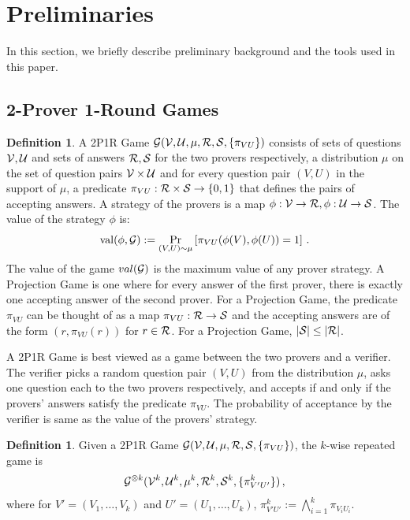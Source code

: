 \documentclass[10pt]{article}
\theoremstyle{definition}
\newtheorem{definition}[theorem]{Definition}
\numberwithin{equation}{section}
\newcommand\calU{{\cal U}}
\newcommand\calV{{\cal V}}
\DeclareMathOperator\val{val}
\renewcommand{\mapsto}{\to}
\begin{document}
\section{Preliminaries}
In this section, we briefly describe preliminary background and the tools used in this paper.

\subsection{2-Prover 1-Round Games}

\begin{definition} \label{def:2p1r} A 2P1R Game ${\cal G}(\calV, \calU, \mu, {\cal R}, {\cal S},
\{ \pi_{VU}\} )$ consists of sets of questions $\calV, \calU$ and
sets of answers ${\cal R}, {\cal S}$ for the two provers
respectively, a distribution $\mu$ on the set of question pairs
$\calV \times \calU$ and for every question pair $(V,U)$ in the
support of $\mu$, a predicate $\pi_{VU}: {\cal R} \times {\cal S}
\mapsto \{0,1\}$ that defines the pairs of accepting answers.
A strategy of the %
provers is a map $\phi: \calV
\mapsto {\cal R}, \phi: \calU \mapsto {\cal S}$. The value of the
strategy $\phi$ is:
\[
  \val(\phi, {\cal G}) := \Pr_{(V,U) \sim \mu} \left[ \pi_{VU} (
  \phi(V), \phi(U) ) =1
 \right]\,.
\]
The value of the game ${\rm val}({\cal G})$ is the maximum value of
any prover strategy. A Projection Game is one where for every answer
of the first prover, there is exactly one accepting answer of the
second prover. For a Projection Game, the predicate $\pi_{VU}$ can
be thought of as a map $\pi_{VU}: {\cal R} \mapsto {\cal S}$ and
the accepting answers are of the form $(r, \pi_{VU}(r))$ for $r \in {\cal R}$.
For a Projection Game, $|{\cal S}| \leq |{\cal R}|$.
\end{definition}

A 2P1R Game is
best viewed as a game between the two provers and a verifier. The verifier
picks a random question pair $(V,U)$
from the distribution $\mu$, asks one question each to the two provers respectively,
and accepts if and only if the provers' answers satisfy the predicate $\pi_{VU}$.
The probability of acceptance
%
by
the verifier is same as the value of 
%
the
provers' strategy.

\begin{definition} Given a 2P1R Game ${\cal G}(\calV, \calU, \mu, {\cal R}, {\cal S},
\{ \pi_{VU}\} )$, the $k$-wise repeated game is
 \[
{\cal G}^{\otimes k}(\calV^k, \calU^k, \mu^k, {\cal R}^k, {\cal S}^k,
\{ \pi^k_{V'U'}\} )\,,
\] where for $V' = (V_1, \ldots, V_k)$ and $U' =
(U_1,\ldots, U_k)$, $\pi^k_{V'U'} := \bigwedge_{i=1}^k \pi_{V_iU_i}$.
\end{definition}
\end{document}
